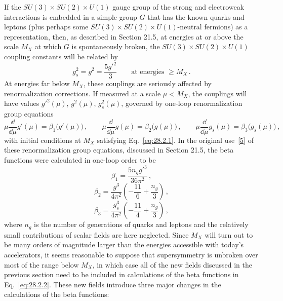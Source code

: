 If the \(SU(3)\times SU(2)\times U(1)\) gauge group of the strong and
electroweak interactions is embedded in a simple group \(G\) that has the
known quarks and leptons (plus perhaps some
\(SU(3)\times SU(2)\times U(1)\)-neutral fermions) as a representation, then,
as described in Section 21.5, at energies at or above the scale \(M_X\) at
which \(G\) is spontaneously broken, the
\(SU(3)\times SU(2)\times U(1)\) coupling constants will be related by
\begin{equation}
  g_s^2=g^2=\frac{5g'^2}{3}
  \qquad\text{at energies }\geq M_X\,.
  \tag{28.2.1}\label{eq:28.2.1}
\end{equation}
At energies far below \(M_X\), these couplings are seriously affected by
renormalization corrections. If measured at a scale \(\mu<M_X\), the
couplings will have values \(g'^2(\mu)\), \(g^2(\mu)\), \(g_s^2(\mu)\),
governed by one-loop renormalization group equations
\begin{equation}
  \mu\frac{\dd}{\dd\mu}g'(\mu)=\beta_1\bigl(g'(\mu)\bigr)\,,
  \qquad
  \mu\frac{\dd}{\dd\mu}g(\mu)=\beta_2\bigl(g(\mu)\bigr)\,,
  \qquad
  \mu\frac{\dd}{\dd\mu}g_s(\mu)=\beta_3\bigl(g_s(\mu)\bigr)\,,
  \tag{28.2.2}\label{eq:28.2.2}
\end{equation}
with initial conditions at \(M_X\) satisfying Eq.~\eqref{eq:28.2.1}. In the
original use~\hyperref[ch28-ref-5]{[5]} of these renormalization group
equations, discussed in Section 21.5, the beta functions were calculated in
one-loop order to be
\begin{equation}
  \beta_1=\frac{5n_g g'^3}{36\pi^2}\,,
  \tag{28.2.3}\label{eq:28.2.3}
\end{equation}
\begin{equation}
  \beta_2=\frac{g^3}{4\pi^2}
  \left(-\frac{11}{6}+\frac{n_g}{3}\right)\,,
  \tag{28.2.4}\label{eq:28.2.4}
\end{equation}
\begin{equation}
  \beta_3=\frac{g_s^3}{4\pi^2}
  \left(-\frac{11}{4}+\frac{n_g}{3}\right)\,,
  \tag{28.2.5}\label{eq:28.2.5}
\end{equation}
where \(n_g\) is the number of generations of quarks and leptons and the
relatively small contributions of scalar fields are here neglected. Since
\(M_X\) will turn out to be many orders of magnitude larger than the
energies accessible with today's accelerators, it seems reasonable to
suppose that supersymmetry is unbroken over most of the range below \(M_X\),
in which case all of the new fields discussed in the previous section need
to be included in calculations of the beta functions in
Eq.~\eqref{eq:28.2.2}. These new fields introduce three major changes in the
calculations of the beta functions:

